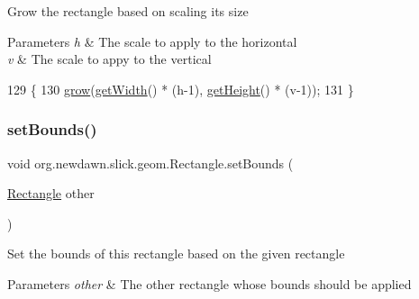 Grow the rectangle based on scaling it\textquotesingle{}s size


\begin{DoxyParams}{Parameters}
{\em h} & The scale to apply to the horizontal \\
\hline
{\em v} & The scale to appy to the vertical \\
\hline
\end{DoxyParams}

\begin{DoxyCode}
129                                             \{
130         \mbox{\hyperlink{classorg_1_1newdawn_1_1slick_1_1geom_1_1_rectangle_a0d5625456b48b72e4b09514d597edcf4}{grow}}(\mbox{\hyperlink{classorg_1_1newdawn_1_1slick_1_1geom_1_1_rectangle_ae2fddc33461303a9ccf8854c1e93c9c1}{getWidth}}() * (h-1), \mbox{\hyperlink{classorg_1_1newdawn_1_1slick_1_1geom_1_1_rectangle_a6c8878e73b4ca0d7a3c2d4e6bcd421ee}{getHeight}}() * (v-1));
131     \}
\end{DoxyCode}
\mbox{\label{classorg_1_1newdawn_1_1slick_1_1geom_1_1_rectangle_abae189b15ef3c66aad1bb3d6145ff565}} 
\subsubsection{\texorpdfstring{set\+Bounds()}{setBounds()}\hspace{0.1cm}{\footnotesize\ttfamily [1/2]}}
{\footnotesize\ttfamily void org.\+newdawn.\+slick.\+geom.\+Rectangle.\+set\+Bounds (\begin{DoxyParamCaption}\item[{\mbox{\hyperlink{classorg_1_1newdawn_1_1slick_1_1geom_1_1_rectangle}{Rectangle}}}]{other }\end{DoxyParamCaption})\hspace{0.3cm}{\ttfamily [inline]}}

Set the bounds of this rectangle based on the given rectangle


\begin{DoxyParams}{Parameters}
{\em other} & The other rectangle whose bounds should be applied \\
\hline
\end{DoxyParams}

